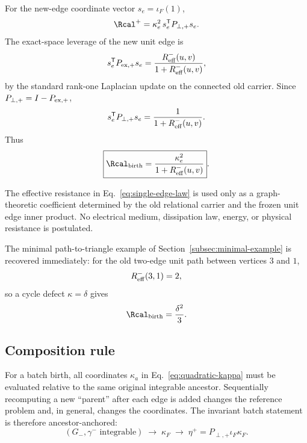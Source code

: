 For the new-edge coordinate vector $s_e=\iota_F(1)$,
\begin{equation}
\Rcal^+
=\kappa_e^2\,s_e^{\mathsf T}P_{\perp,+}s_e.
\end{equation}
The exact-space leverage of the new unit edge is
\begin{equation}
s_e^{\mathsf T}P_{{\rm ex},+}s_e
=\frac{R_{\rm eff}^-(u,v)}{1+R_{\rm eff}^-(u,v)},
\label{eq:new-edge-leverage}
\end{equation}
by the standard rank-one Laplacian update on the connected old carrier. Since $P_{\perp,+}=I-P_{{\rm ex},+}$,
\begin{equation}
s_e^{\mathsf T}P_{\perp,+}s_e
=\frac{1}{1+R_{\rm eff}^-(u,v)}.
\end{equation}
Thus
\begin{equation}
\boxed{
\Rcal_{\rm birth}
=
\frac{\kappa_e^2}
{1+R_{\rm eff}^-(u,v)}
}.
\label{eq:single-edge-law}
\end{equation}

The effective resistance in Eq.~\eqref{eq:single-edge-law} is used only as a graph-theoretic coefficient determined by the old relational carrier and the frozen unit edge inner product. No electrical medium, dissipation law, energy, or physical resistance is postulated.

The minimal path-to-triangle example of Section~\ref{subsec:minimal-example} is recovered immediately: for the old two-edge unit path between vertices $3$ and $1$,
\begin{equation}
R_{\rm eff}^-(3,1)=2,
\end{equation}
so a cycle defect $\kappa=\delta$ gives
\begin{equation}
\Rcal_{\rm birth}=\frac{\delta^2}{3}.
\end{equation}

\subsection{Composition rule}

For a batch birth, all coordinates $\kappa_a$ in Eq.~\eqref{eq:quadratic-kappa} must be evaluated relative to the same original integrable ancestor. Sequentially recomputing a new ``parent'' after each edge is added changes the reference problem and, in general, changes the coordinates. The invariant batch statement is therefore ancestor-anchored:
\begin{equation}
\boxed{
(G_-,\gamma^-\text{ integrable})
\;\longrightarrow\;
\kappa_F
\;\longrightarrow\;
\eta^+=P_{\perp,+}\iota_F\kappa_F.
}
\label{eq:ancestor-anchor}
\end{equation}

